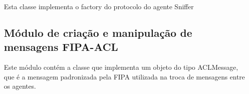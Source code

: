 \documentclass[letterpaper,10pt,brazil]{sphinxmanual}
\begin{document}

\begin{fulllineitems}
\label{api:pade.core.sniffer.SnifferFactory}
Esta classe implementa o factory do protocolo do agente Sniffer

\end{fulllineitems}

\label{api:module-pade.acl.messages}

\subsection{Módulo de criação e manipulação de mensagens FIPA-ACL}
\label{api:modulo-de-criacao-e-manipulacao-de-mensagens-fipa-acl}
Este módulo contém a classe que implementa um objeto do tipo
ACLMessage, que é a mensagem padronizada pela FIPA utilizada
na troca de mensagens entre os agentes.
\end{document}
